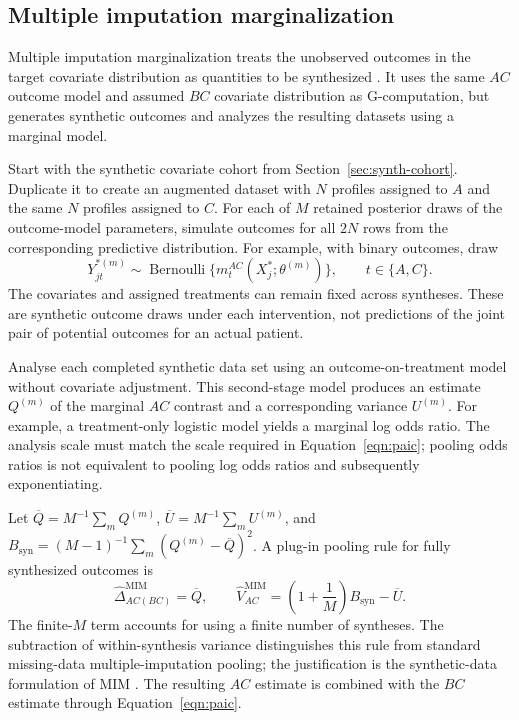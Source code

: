\documentclass[article]{jss}
\begin{document}
\subsection{Multiple imputation marginalization}
\label{sec:mim}
Multiple imputation marginalization treats the unobserved outcomes in the target covariate distribution as quantities to be synthesized \citep{RemiroAzocar2022b}. It uses the same $AC$ outcome model and assumed $BC$ covariate distribution as G-computation, but generates synthetic outcomes and analyzes the resulting datasets using a marginal model.

Start with the synthetic covariate cohort from Section~\ref{sec:synth-cohort}. Duplicate it to create an augmented dataset with $N$ profiles assigned to $A$ and the same $N$ profiles assigned to $C$. For each of $M$ retained posterior draws of the outcome-model parameters, simulate outcomes for all $2N$ rows from the corresponding predictive distribution. For example, with binary outcomes, draw
\[
Y^{*(m)}_{jt}\sim\operatorname{Bernoulli}
\{m_t^{AC}(X_j^*;\theta^{(m)})\},\qquad t\in\{A,C\}.
\]
The covariates and assigned treatments can remain fixed across syntheses. These are synthetic outcome draws under each intervention, not predictions of the joint pair of potential outcomes for an actual patient.

Analyse each completed synthetic data set using an outcome-on-treatment model without covariate adjustment. This second-stage model produces an estimate $Q^{(m)}$ of the marginal $AC$ contrast and a corresponding variance $U^{(m)}$. For example, a treatment-only logistic model yields a marginal log odds ratio. The analysis scale must match the scale required in Equation~\ref{eqn:paic}; pooling odds ratios is not equivalent to pooling log odds ratios and subsequently exponentiating.

Let $\overline Q=M^{-1}\sum_m Q^{(m)}$, $\overline U=M^{-1}\sum_m U^{(m)}$, and $B_{\mathrm{syn}}=(M-1)^{-1}\sum_m(Q^{(m)}-\overline Q)^2$. A plug-in pooling rule for fully synthesized outcomes is
\begin{equation}
\label{eqn:pooling-results}
\widehat\Delta^{\mathrm{MIM}}_{AC(BC)}=\overline Q,
\qquad
\widehat V_{AC}^{\mathrm{MIM}}
=\left(1+\frac{1}{M}\right)B_{\mathrm{syn}}-\overline U.
\end{equation}
The finite-$M$ term accounts for using a finite number of syntheses. The subtraction of within-synthesis variance distinguishes this rule from standard missing-data multiple-imputation pooling; the justification is the synthetic-data formulation of MIM \citep{RemiroAzocar2022b}. The resulting $AC$ estimate is combined with the $BC$ estimate through Equation~\ref{eqn:paic}.
\end{document}
